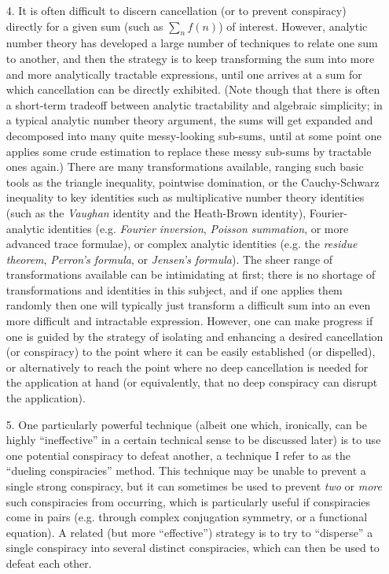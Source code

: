 \documentclass[10pt,reqno]{amsart}
\begin{document}
\begin{enumerate}
    \item[4.] It is often difficult to discern cancellation (or to prevent conspiracy) directly for a given sum (such as $\sum_n f(n)$) of interest. However, analytic number theory has developed a large number of techniques to relate one sum to another, and then the strategy is to keep transforming the sum into more and more analytically tractable expressions, until one arrives at a sum for which cancellation can be directly exhibited. (Note though that there is often a short-term tradeoff between analytic tractability and algebraic simplicity; in a typical analytic number theory argument, the sums will get expanded and decomposed into many quite messy-looking sub-sums, until at some point one applies some crude estimation to replace these messy sub-sums by tractable ones again.) There are many transformations available, ranging such basic tools as the triangle inequality, pointwise domination, or the Cauchy-Schwarz inequality to key identities such as multiplicative number theory identities (such as the \emph{Vaughan} identity and the Heath-Brown identity), Fourier-analytic identities (e.g. \emph{Fourier inversion}, \emph{Poisson summation}, or more advanced trace formulae), or complex analytic identities (e.g. the \emph{residue theorem}, \emph{Perron’s formula}, or \emph{Jensen’s formula}). The sheer range of transformations available can be intimidating at first; there is no shortage of transformations and identities in this subject, and if one applies them randomly then one will typically just transform a difficult sum into an even more difficult and intractable expression. However, one can make progress if one is guided by the strategy of isolating and enhancing a desired cancellation (or conspiracy) to the point where it can be easily established (or dispelled), or alternatively to reach the point where no deep cancellation is needed for the application at hand (or equivalently, that no deep conspiracy can disrupt the application).
    
    \item[5.] One particularly powerful technique (albeit one which, ironically, can be highly “ineffective” in a certain technical sense to be discussed later) is to use one potential conspiracy to defeat another, a technique I refer to as the “dueling conspiracies” method. This technique may be unable to prevent a single strong conspiracy, but it can sometimes be used to prevent \emph{two} or \emph{more} such conspiracies from occurring, which is particularly useful if conspiracies come in pairs (e.g. through complex conjugation symmetry, or a functional equation). A related (but more “effective”) strategy is to try to “disperse” a single conspiracy into several distinct conspiracies, which can then be used to defeat each other.
\end{enumerate}
\end{document}
